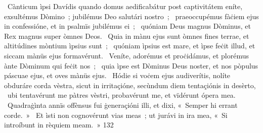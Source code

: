 {~Cànticum ìpsi Davídis quando domus aedificabátur post captivitátem}
{%
eníte, exsultémus Dòmino~; jubilémus Deo salutári nostro~;
~praeoccupémus fàċiem ejus in confessióne, et in psalmïs jubilémus ei~;
~quóniam Deus magnus Dòminus, et Rex magnus super òmnes Deos.
~Quia in mànu ejus sunt òmnes fines terrae, et altitúdines mòntium ìpsius sunt~;
~quóniam ìpsius est mare, et ìpse feċit illud, et siccam mànüs ejus formavérunt.
~Veníte, adorémus et proċidámus, et plorémus ànte Dòminum qui feċit nos~;
~quia ìpse est Dòminus Deus noster, et nos pòpulus páscuae ejus, et oves mànüs ejus.
~Hódie si voċem ejus audiverítis, nolíte obduráre corda vèstra, sicut in irritaçióne, secùndum diem tentaçiónis in desèrto,
~ubi tentavérunt me pàtres vèstri, probavérunt me, et vïdérunt ópera mea.
~Quadraġìnta annïs offènsus fui ġeneraçióni illi, et dixi, «~Semper hi errant corde.~»
~Et ìsti non cognovérunt vias meas~; ut jurávi in ira mea, «~Si introíbunt in rèquiem meam.~»}
{13}{2}
